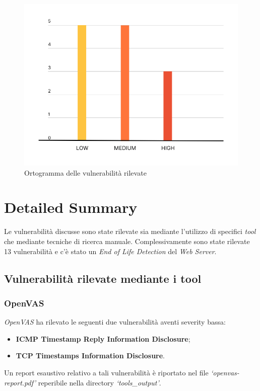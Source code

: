 \documentclass[a4paper,11pt,oneside,top=3cm,bottom=3cm,left=3.5cm,right=3.5cm,openright,reqno,table]{book}
\begin{document}
\begin{figure}[h]
    \centering
    \includegraphics[scale=0.4]{capitoli/images/ortogramma.png}
    \caption{Ortogramma delle vulnerabilità rilevate}
    \label{fig:istogramma}
\end{figure}
\section{Detailed Summary}
Le vulnerabilità discusse sono state rilevate sia mediante l'utilizzo di specifici \emph{tool} che mediante tecniche di ricerca manuale. Complessivamente sono state rilevate 13 vulnerabilità e c'è stato un \emph{End of Life Detection} del \emph{Web Server}. 
\subsection{Vulnerabilità rilevate mediante i tool}
\subsubsection{OpenVAS}
\emph{OpenVAS} ha rilevato le seguenti due vulnerabilità aventi severity bassa:
\begin{itemize}
    \item \textbf{ICMP Timestamp Reply Information Disclosure};
    \item \textbf{TCP Timestamps Information Disclosure}.
\end{itemize}
Un report esaustivo relativo a tali vulnerabilità è riportato nel file \emph{`openvas-report.pdf'} reperibile nella directory \emph{`tools\_output'}.
\end{document}
